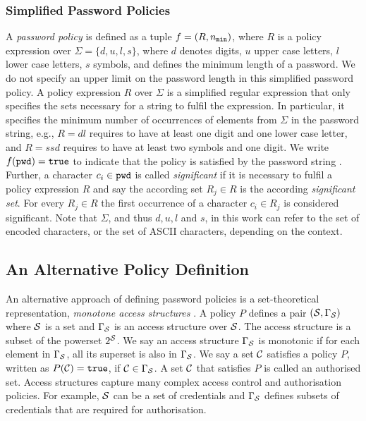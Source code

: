 \subsubsection{Simplified Password Policies}
A \emph{password policy} is defined as a tuple $f=(R,{n_\mathtt{min}})$, where $R$ is a policy expression over $\Sigma=\{d, u, l, s\}$, where $d$ denotes digits, $u$ upper case letters, $l$ lower case letters, $s$ symbols, and \pmin defines the minimum length of a password.
We do not specify an upper limit on the password length in this simplified password policy.
A policy expression $R$ over $\Sigma$ is a simplified regular expression that only specifies the sets necessary for a string to fulfil the expression.
In particular, it specifies the minimum number of occurrences of elements from $\Sigma$ in the password string, e.g., $R=dl$ requires \pwd to have at least one digit and one lower case letter, and $R=ssd$ requires \pwd to have at least two symbols and one digit.
We write $f(\mathtt{pwd})=\mathtt{true}$ to indicate that the policy is satisfied by the password string \pwd.
Further, a character $c_i\in\mathtt{pwd}$ is called \emph{significant} if it is necessary to fulfil a policy expression $R$ and say the according set $R_j\in R$ is the according \emph{significant set}.
For every $R_j\in R$ the first occurrence of a character $c_i\in R_j$ is considered significant.
Note that $\Sigma$, and thus $d,u,l$ and $s$, in this work can refer to the set of encoded characters, or the set of ASCII characters, depending on the context.

\subsection{An Alternative Policy Definition} \label{sec:lsss}
An alternative approach of defining password policies is a set-theoretical representation, \ie \emph{monotone access structures} \cite{ito89}.
A policy $P$ defines a pair $(\mathcal{S},\Gamma_\mathcal{S})$ where $\mathcal{S}$ is a set and $\Gamma_\mathcal{S}$ is an access structure over $\mathcal{S}$. 
The access structure is a subset of the powerset $2^\mathcal{S}$. 
We say an access structure $\Gamma_\mathcal{S}$ is monotonic if for each element in $\Gamma_\mathcal{S}$, all its superset is also in $\Gamma_\mathcal{S}$. 
We say a set $\mathcal{C}$ satisfies a policy $P$, written as $P(\mathcal{C})=\mathtt{true}$, if $\mathcal{C}\in \Gamma_\mathcal{S}$. 
A set $\mathcal{C}$ that satisfies $P$ is called an authorised set. 
Access structures capture many complex access control and authorisation policies. For example, $\mathcal{S}$ can be a set of credentials and $\Gamma_\mathcal{S}$ defines subsets of credentials that are required for authorisation.

